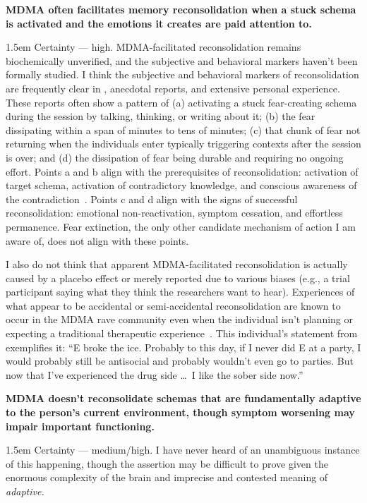 \documentclass[11pt,oneside]{book}
\let\cite\parencite
\newcommand{\claim}[2]{%
    \par\medskip\noindent\textbf{#1}%
    \begin{adjustwidth}{1.5em}{}%
    \setlength{\parindent}{0pt}%
    \setlength{\parskip}{0.5\baselineskip}%
    #2%
    \end{adjustwidth}%
}
\begin{document}
\claim{MDMA often facilitates memory reconsolidation when a stuck schema is activated and the emotions it creates are paid attention to.}{Certainty --- high. MDMA-facilitated reconsolidation remains biochemically unverified, and the subjective and behavioral markers haven't been formally studied. I think the subjective and behavioral markers of reconsolidation are frequently clear in \textcite{fedduciaMDMAMemoryReconsolidation}, anecdotal reports, and extensive personal experience. These reports often show a pattern of (a) activating a stuck fear-creating schema during the session by talking, thinking, or writing about it; (b) the fear dissipating within a span of minutes to tens of minutes; (c) that chunk of fear not returning when the individuals enter typically triggering contexts after the session is over; and (d) the dissipation of fear being durable and requiring no ongoing effort. Points a and b align with the prerequisites of reconsolidation: activation of target schema, activation of contradictory knowledge, and conscious awareness of the contradiction~\cite{eckerUnlocking}. Points c and d align with the signs of successful reconsolidation: emotional non-reactivation, symptom cessation, and effortless permanence. Fear extinction, the only other candidate mechanism of action I am aware of, does not align with these points.

I also do not think that apparent MDMA-facilitated reconsolidation is actually caused by a placebo effect or merely reported due to various biases (e.g., a trial participant saying what they think the researchers want to hear). Experiences of what appear to be accidental or semi-accidental reconsolidation are known to occur in the MDMA rave community even when the individual isn't planning or expecting a traditional therapeutic experience~\cite{huntEcstacy}. This individual's statement from \textcite[p. 344]{huntEcstacy} exemplifies it: \enquote{E broke the ice. Probably to this day, if I never did E at a party, I would probably still be antisocial and probably wouldn't even go to parties. But now that I've experienced the drug side \dots\ I like the sober side now.}}
\claim{MDMA doesn't reconsolidate schemas that are fundamentally adaptive to the person's current environment, though symptom worsening may impair important functioning.}{Certainty --- medium/high. I have never heard of an unambiguous instance of this happening, though the assertion may be difficult to prove given the enormous complexity of the brain and imprecise and contested meaning of \textit{adaptive.}}
\end{document}

